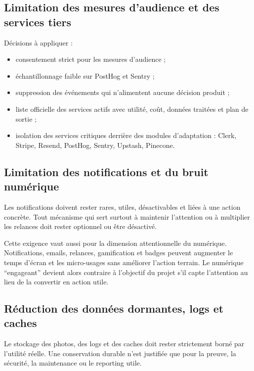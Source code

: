 \documentclass[
  10pt,
  a4paper,
  DIV=11,
  numbers=noendperiod,
  oneside]{scrreprt}
\providecommand{\tightlist}{%
  \setlength{\itemsep}{0pt}\setlength{\parskip}{0pt}}
\begin{document}
\subsection{Limitation des mesures d'audience et des services
tiers}\label{limitation-des-mesures-daudience-et-des-services-tiers}

Décisions à appliquer :

\begin{itemize}
\tightlist
\item
  consentement strict pour les mesures d'audience ;
\item
  échantillonnage faible sur PostHog et Sentry ;
\item
  suppression des événements qui n'alimentent aucune décision produit ;
\item
  liste officielle des services actifs avec utilité, coût, données
  traitées et plan de sortie ;
\item
  isolation des services critiques derrière des modules d'adaptation :
  Clerk, Stripe, Resend, PostHog, Sentry, Upstash, Pinecone.
\end{itemize}

\subsection{Limitation des notifications et du bruit
numérique}\label{limitation-des-notifications-et-du-bruit-numuxe9rique}

Les notifications doivent rester rares, utiles, désactivables et liées à
une action concrète. Tout mécanisme qui sert surtout à maintenir
l'attention ou à multiplier les relances doit rester optionnel ou être
désactivé.

Cette exigence vaut aussi pour la dimension attentionnelle du numérique.
Notifications, emails, relances, gamification et badges peuvent
augmenter le temps d'écran et les micro-usages sans améliorer l'action
terrain. Le numérique ``engageant'' devient alors contraire à l'objectif
du projet s'il capte l'attention au lieu de la convertir en action
utile.

\subsection{Réduction des données dormantes, logs et
caches}\label{ruxe9duction-des-donnuxe9es-dormantes-logs-et-caches}

Le stockage des photos, des logs et des caches doit rester strictement
borné par l'utilité réelle. Une conservation durable n'est justifiée que
pour la preuve, la sécurité, la maintenance ou le reporting utile.
\end{document}
